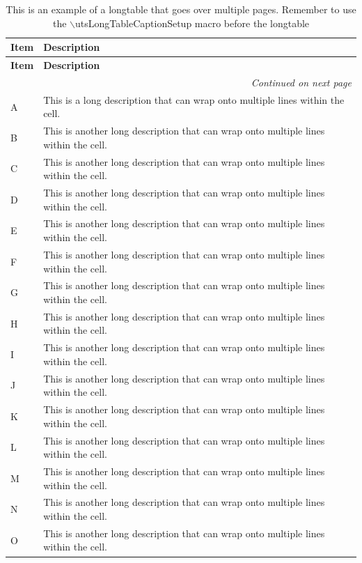 \utsLongTableCaptionSetup
\begin{longtable}{|l|p{10cm}|}
\caption{This is an example of a longtable that goes over multiple pages. Remember to use the $\backslash$utsLongTableCaptionSetup macro before the longtable}\label{tab:longtable-example}\\
\hline
\textbf{Item} & \textbf{Description} \\
\hline
\endfirsthead

\hline
\textbf{Item} & \textbf{Description} \\
\hline
\endhead

\hline
\multicolumn{2}{|r|}{\textit{Continued on next page}} \\
\hline
\endfoot

\hline
\endlastfoot

A & This is a long description that can wrap onto multiple lines within the cell. \\
\hline
B & This is another long description that can wrap onto multiple lines within the cell. \\
\hline
C & This is another long description that can wrap onto multiple lines within the cell. \\
\hline
D & This is another long description that can wrap onto multiple lines within the cell. \\
\hline
E & This is another long description that can wrap onto multiple lines within the cell. \\
\hline
F & This is another long description that can wrap onto multiple lines within the cell. \\
\hline
G & This is another long description that can wrap onto multiple lines within the cell. \\
\hline
H & This is another long description that can wrap onto multiple lines within the cell. \\
\hline
I & This is another long description that can wrap onto multiple lines within the cell. \\
\hline
J & This is another long description that can wrap onto multiple lines within the cell. \\
\hline
K & This is another long description that can wrap onto multiple lines within the cell. \\
\hline
L & This is another long description that can wrap onto multiple lines within the cell. \\
\hline
M & This is another long description that can wrap onto multiple lines within the cell. \\
\hline
N & This is another long description that can wrap onto multiple lines within the cell. \\
\hline
O & This is another long description that can wrap onto multiple lines within the cell. \\
\hline

\end{longtable}
